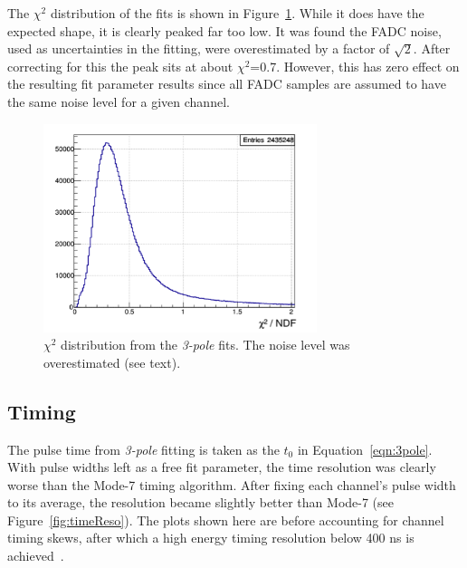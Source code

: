 \documentclass[amsmath,amssymb,notitlepage,12pt]{revtex4-1}
\begin{document}
The $\chi^2$ distribution of the fits is shown in Figure~\ref{fig:chi2}.  While it does have the expected shape, it is clearly peaked far too low.  It was found the FADC noise, used as uncertainties in the fitting, were overestimated by a factor of $\sqrt{2}$.  After correcting for this the peak sits at about $\chi^2$=0.7.  However, this has zero effect on the resulting fit parameter results since all FADC samples are assumed to have the same noise level for a given channel.
\begin{figure}[htbp]\centering
  \includegraphics[width=8cm]{pics/chi2.png}
  \caption{$\chi^2$ distribution from the {\em 3-pole} fits.  The noise level was overestimated (see text).\label{fig:chi2}}
\end{figure}

\subsection{Timing}
The pulse time from {\em 3-pole} fitting is taken as the $t_0$ in Equation~\ref{eqn:3pole}.  With pulse widths left as a free fit parameter, the time resolution was clearly worse than the Mode-7 timing algorithm.  After fixing each channel's pulse width to its average, the resolution became slightly better than Mode-7 (see Figure~\ref{fig:timeReso}).  
The plots shown here are before accounting for channel timing skews, after which a high energy timing resolution below 400 ns is achieved~\cite{timingCalibration}.
\end{document}

